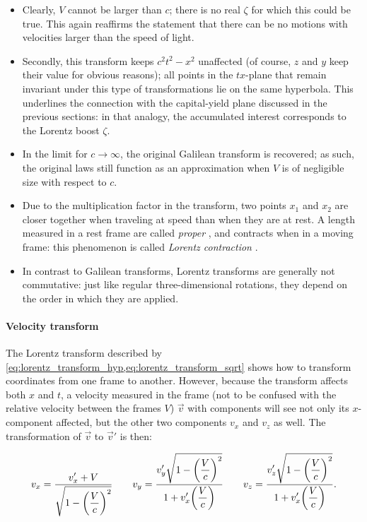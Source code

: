 \begin{itemize}
    \item Clearly, \(V\) cannot be larger than \(c\); there is no real \(\zeta\) for which this could be true. This again reaffirms the statement that there can be no motions with velocities larger than the speed of light.
    \item Secondly, this transform keeps \(c^2t^2 - x^2\) unaffected (of course, \(z\) and \(y\) keep their value for obvious reasons); all points in the \(tx\)-plane that remain invariant under this type of transformations lie on the same hyperbola. This underlines the connection with the capital-yield plane discussed in the previous sections: in that analogy, the accumulated interest corresponds to the Lorentz boost \(\zeta\).
    \item In the limit for \(c \to \infty\), the original Galilean transform is recovered; as such, the original laws still function as an approximation when \(V\) is of negligible size with respect to \(c\).
    \item Due to the multiplication factor in the transform, two points \(x_1\) and \(x_2\) are closer together when traveling at speed than when they are at rest. A length measured in a rest frame are called \emph{proper} , and contracts when in a moving frame: this phenomenon is called \emph{Lorentz contraction}  \cite{Landau1971}.
    \item In contrast to Galilean transforms, Lorentz transforms are generally not commutative: just like regular three-dimensional rotations, they depend on the order in which they are applied.
\end{itemize}
\paragraph{Velocity transform} The Lorentz transform described by \cref{eq:lorentz_transform_hyp,eq:lorentz_transform_sqrt} shows how to transform coordinates from one frame to another. However, because the transform affects both \(x\) and \(t\), a velocity measured in the frame (not to be confused with the relative velocity between the frames \(V\)) \(\vec{v}\) with components will see not only its \(x\)-component affected, but the other two components \(v_x\) and \(v_z\) as well. The transformation of \(\vec{v}\) to \(\vec{v}'\) is then: \cite{Landau1971}

\begin{equation}
    v_x = \frac{\displaystyle v_x' + V}{\displaystyle \sqrt{1 - \qty(\frac{V}{c})^2}}\qquad 
    v_y = \frac{\displaystyle v_y'\sqrt{1 - \qty(\frac{V}{c})^2}}{\displaystyle 1 + v_x'
    \qty(\frac{V}{c})}\qquad
    v_z = \frac{\displaystyle v_z'\sqrt{1 - \qty(\frac{V}{c})^2}}{\displaystyle 1 + v_x'\qty(\frac{V}{c})}.
    \label{eq:lorentz_transform_vel}
\end{equation}


